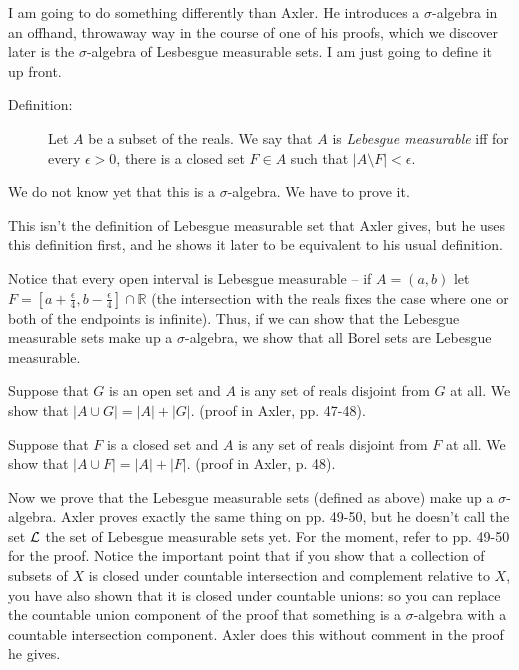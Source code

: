 \documentclass[12pt]{article}
\begin{document}
I am going to do something differently than Axler.  He introduces a $\sigma$-algebra in an offhand, throwaway way in the course of one of his proofs, which we discover later is the $\sigma$-algebra of Lesbesgue measurable sets.  I am just going to define it up front.

\begin{description}

\item[Definition:]  Let $A$ be a subset of the reals.  We say that $A$ is {\em Lebesgue measurable\/} iff for every $\epsilon>0$, there is a closed set $F \in A$ such that $|A \setminus F|<\epsilon$.

\end{description}

We do not know yet that this is a $\sigma$-algebra.  We have to prove it.

This isn't the definition of Lebesgue measurable set that Axler gives, but he uses this definition first, and he shows it later to be equivalent to his usual definition.

Notice that every open interval is Lebesgue measurable -- if $A = (a,b)$ let $F = [a+\frac{\epsilon}4,b-\frac{\epsilon}4]\cap \mathbb R$ (the intersection with the reals fixes the case where one or both of the endpoints is infinite).  Thus, if we can show that the Lebesgue measurable sets make up a $\sigma$-algebra, we show that all Borel sets are Lebesgue measurable.

Suppose that $G$ is an open set and $A$ is any set of reals disjoint from $G$ at all.  We show that $|A \cup G| = |A|+|G|$.  (proof in Axler, pp. 47-48).

Suppose that $F$ is a closed set and $A$ is any set of reals disjoint from $F$ at all.  We show that $|A \cup F| = |A|+|F|$.  (proof in Axler, p. 48).

Now we prove that the Lebesgue measurable sets (defined as above) make up a $\sigma$-algebra.  Axler proves exactly the same thing on pp. 49-50, but he doesn't call the set $\cal L$ the set of Lebesgue measurable sets yet.  For the moment, refer to pp. 49-50 for the proof.  Notice the important point that if you show that a collection of subsets of $X$ is closed under countable intersection and complement relative to $X$, you have also shown that it is closed under countable unions:  so you can replace the countable union component of the proof that something is a $\sigma$-algebra with a countable intersection component.  Axler does this without comment in the proof he gives.
\end{document}
